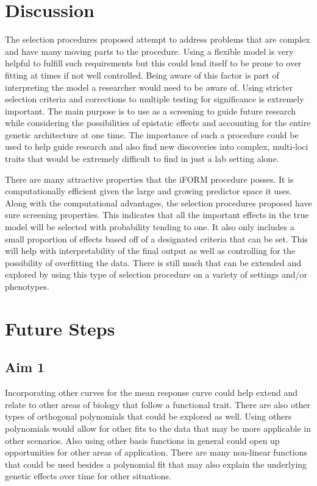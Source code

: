 \documentclass[11pt,]{book}
\theoremstyle{definition}
\theoremstyle{definition}
\theoremstyle{remark}
\begin{document}
\section{Discussion}\label{discussion-3}

The selection procedures proposed attempt to address problems that are
complex and have many moving parts to the procedure. Using a flexible
model is very helpful to fulfill such requirements but this could lend
itself to be prone to over fitting at times if not well controlled.
Being aware of this factor is part of interpreting the model a
researcher would need to be aware of. Using stricter selection criteria
and corrections to multiple testing for significance is extremely
important. The main purpose is to use as a screening to guide future
research while considering the possibilities of epistatic effects and
accounting for the entire genetic architecture at one time. The
importance of such a procedure could be used to help guide research and
also find new discoveries into complex, multi-loci traits that would be
extremely difficult to find in just a lab setting alone.

There are many attractive properties that the iFORM procedure posses. It
is computationally efficient given the large and growing predictor space
it uses. Along with the computational advantages, the selection
procedures proposed have sure screening properties. This indicates that
all the important effects in the true model will be selected with
probability tending to one. It also only includes a small proportion of
effects based off of a designated criteria that can be set. This will
help with interpretability of the final output as well as controlling
for the possibility of overfitting the data. There is still much that
can be extended and explored by using this type of selection procedure
on a variety of settings and/or phenotypes.

\section{Future Steps}\label{future-steps}

\subsection{Aim 1}\label{aim-1}

Incorporating other curves for the mean response curve could help extend
and relate to other areas of biology that follow a functional trait.
There are also other types of orthogonal polynomials that could be
explored as well. Using others polynomials would allow for other fits to
the data that may be more applicable in other scenarios. Also using
other basis functions in general could open up opportunities for other
areas of application. There are many non-linear functions that could be
used besides a polynomial fit that may also explain the underlying
genetic effects over time for other situations.
\end{document}
